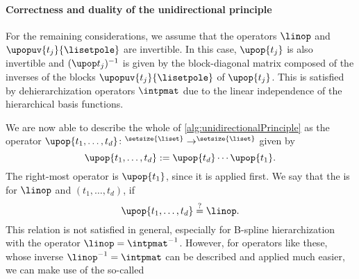 %  

\paragraph{Correctness and duality of the unidirectional principle}

For the remaining considerations, we assume that
the operators $\linop$ and $\upopuv{t_j}{\lisetpole}$ are invertible.
In this case, $\upop{t_j}$ is also invertible and
$\upopinv{t_j}$ is given by the block-diagonal matrix composed of
the inverses of the blocks $\upopuv{t_j}{\lisetpole}$ of $\upop{t_j}$.
This is satisfied by dehierarchization operators $\intpmat$ due to the
linear independence of the hierarchical basis functions.

We are now able to describe the whole \up of
\cref{alg:unidirectionalPrinciple} as the operator
$\upop{t_1,\dotsc,t_d}\colon \real^{\setsize{\liset}} \to
\real^{\setsize{\liset}}$ given by
\begin{equation}
  \label{eq:upopProduct}
  \upop{t_1,\dotsc,t_d}
  := \upop{t_d} \dotsm \upop{t_1}.
\end{equation}
The right-most operator is $\upop{t_1}$, since it is applied first.
We say that the \up is  for $\linop$ and
$(t_1, \dotsc, t_d)$, if
\begin{equation}
  \upop{t_1,\dotsc,t_d}
  \overset{?}{=} \linop.
\end{equation}
This relation is not satisfied in general,
especially for B-spline hierarchization with the operator
$\linop = \intpmatinv$.
However, for operators like these, whose inverse
$\linopinv = \intpmat$ can be described and applied much easier,
we can make use of the so-called 

